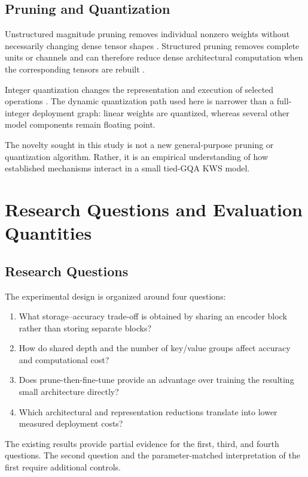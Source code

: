 \documentclass[journal]{IEEEtran}
\begin{document}
\subsection{Pruning and Quantization}

Unstructured magnitude pruning removes individual nonzero weights
without necessarily changing dense tensor shapes
\cite{han2015learning}.
Structured pruning removes complete units or channels and can
therefore reduce dense architectural computation when the
corresponding tensors are rebuilt
\cite{li2017pruning}.

Integer quantization changes the representation and execution of
selected operations
\cite{jacob2018quantization}.
The dynamic quantization path used here is narrower than a
full-integer deployment graph: linear weights are quantized,
whereas several other model components remain floating point.

The novelty sought in this study is not a new general-purpose
pruning or quantization algorithm.
Rather, it is an empirical understanding of how established
mechanisms interact in a small tied-GQA KWS model.

\section{Research Questions and Evaluation Quantities}

\subsection{Research Questions}

The experimental design is organized around four questions:
\begin{enumerate}
  \item What storage--accuracy trade-off is obtained by sharing an
  encoder block rather than storing separate blocks?
  \item How do shared depth and the number of key/value groups
  affect accuracy and computational cost?
  \item Does prune-then-fine-tune provide an advantage over training
  the resulting small architecture directly?
  \item Which architectural and representation reductions
  translate into lower measured deployment costs?
\end{enumerate}

The existing results provide partial evidence for the first,
third, and fourth questions.
The second question and the parameter-matched interpretation of
the first require additional controls.
\end{document}
